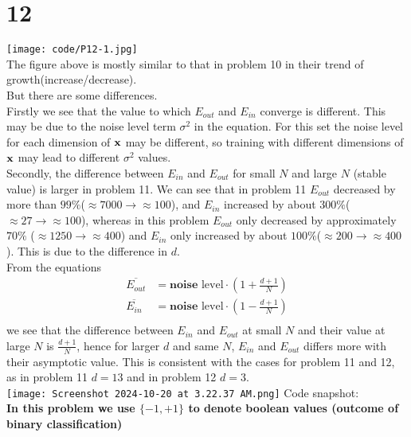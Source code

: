 \documentclass[11pt]{article}
\theoremstyle{definition}
\begin{document}
\section*{12}
\texttt{[image: code/P12-1.jpg]} \\ 
The figure above is mostly similar to that in problem 10 in their trend of growth(increase/decrease). \\  
But there are some differences.\\ 
Firstly we see that the value to which $E_{out}$ and $E_{in}$ converge is different. This may be due to the noise level term $\sigma^2$ in the equation. For this set the noise level for each dimension of $\vb{x}$ may be different, so training with different dimensions of $\vb{x}$ may lead to different $\sigma^2$ values. \\ 
Secondly, the difference between $E_{in}$ and $E_{out}$ for small $N$ and large $N$ (stable value) is larger in problem 11. We can see that in problem 11 $E_{out}$ decreased by more than $99\%$($\approx 7000\rightarrow\approx 100$), and $E_{in}$ increased by about $300\%$($\approx 27\rightarrow \approx 100$), whereas in this problem $E_{out}$ only decreased by approximately $70\%$ ($\approx1250\rightarrow \approx 400$) and $E_{in}$ only increased by about $100\%$($\approx200\rightarrow\approx 400$). This is due to the difference in $d$.\\ 
From the equations 
\begin{align*}
  \overline{E_{out}} &= \textbf{noise }\text{level}\cdot (1 + \frac{d + 1}{N}) \\
  \overline{E_{in}} &= \textbf{noise }\text{level}\cdot (1 - \frac{d + 1}{N}) \\
\end{align*}
we see that the difference between $E_{in}$ and $E_{out}$ at small $N$ and their value at large $N$ is $\frac{d + 1}{N}$, hence for larger $d$ and same $N$, $E_{in}$ and $E_{out}$ differs more with their asymptotic value. This is consistent with the cases for problem 11 and 12, as in problem 11 $d = 13$ and in problem 12 $d = 3$. \\
\texttt{[image: Screenshot 2024-10-20 at 3.22.37 AM.png]} 
Code snapshot: \\ 
\newpage
\large{\textbf{In this problem we use $\{-1, +1\}$ to denote boolean values (outcome of binary classification)}}
\end{document}
